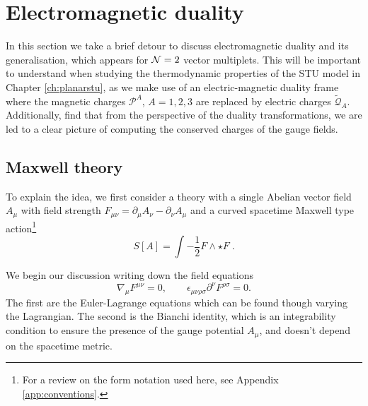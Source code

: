 \section{Electromagnetic duality}
\label{sec:electromagneticduality}
 
In this section we take a brief detour to discuss electromagnetic duality and its generalisation, which appears for ${\cal N} = 2$ vector multiplets. This will be important to understand when studying the thermodynamic properties of the STU model in Chapter \ref{ch:planarstu}, as we make use of an electric-magnetic duality frame where the magnetic charges $\mathcal{P}^A$, $A=1,2,3$ are replaced by electric charges $\tilde{\mathcal{Q}}_A$. Additionally, find that from the perspective of the duality transformations, we are led to a clear picture of computing the conserved charges of the gauge fields.

\subsection{Maxwell theory}

To explain the idea, we first consider a theory with a single Abelian vector field
$A_\mu$ with field strength $F_{\mu \nu} = \partial_\mu A_\nu - \partial_\nu A_\mu$ and a curved spacetime Maxwell type action\footnote{For a review on the form notation used here, see Appendix \ref{app:conventions}.}
\begin{equation}
\label{eq:maxwell}
S[A] = \int - \frac{1}{2} F \wedge \star F \;.
\end{equation}


We begin our discussion writing down the field equations
\begin{equation*}
	\nabla_\mu F^{\mu \nu} = 0, \qquad \epsilon_{\mu \nu \rho \sigma} \partial^{\nu} F^{\rho \sigma} = 0.
\end{equation*}
The first are the Euler-Lagrange equations which can be found though varying the Lagrangian. The second is the Bianchi identity, which is an integrability condition to ensure the presence of the gauge potential $A_\mu$, and doesn't depend on the spacetime metric. 

